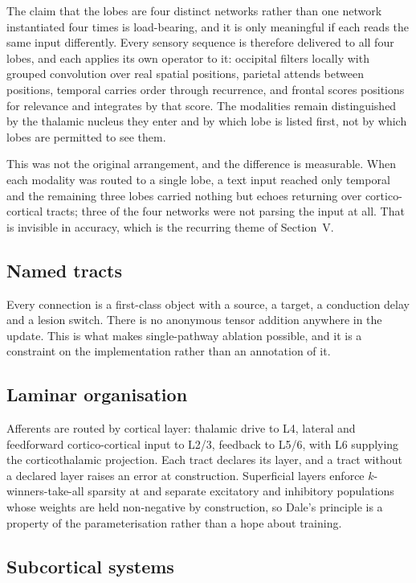 \documentclass[conference]{IEEEtran}
\begin{document}
The claim that the lobes are four distinct networks rather than one network
instantiated four times is load-bearing, and it is only meaningful if each
reads the same input differently. Every sensory sequence is therefore delivered
to all four lobes, and each applies its own operator to it: occipital filters
locally with grouped convolution over real spatial positions, parietal attends
between positions, temporal carries order through recurrence, and frontal
scores positions for relevance and integrates by that score. The modalities
remain distinguished by the thalamic nucleus they enter and by which lobe is
listed first, not by which lobes are permitted to see them.

This was not the original arrangement, and the difference is measurable. When
each modality was routed to a single lobe, a text input reached only temporal
and the remaining three lobes carried nothing but echoes returning over
cortico-cortical tracts; three of the four networks were not parsing the input
at all. That is invisible in accuracy, which is the recurring theme of
Section~V.

\subsection{Named tracts}

Every connection is a first-class object with a source, a target, a conduction
delay and a lesion switch. There is no anonymous tensor addition anywhere in the
update. This is what makes single-pathway ablation possible, and it is a
constraint on the implementation rather than an annotation of it.

\subsection{Laminar organisation}

Afferents are routed by cortical layer: thalamic drive to L4, lateral and
feedforward cortico-cortical input to L2/3, feedback to L5/6, with L6 supplying
the corticothalamic projection. Each tract declares its layer, and a tract
without a declared layer raises an error at construction. Superficial layers
enforce $k$-winners-take-all sparsity at
\ArchitectureSparsity{} and separate excitatory and inhibitory populations whose
weights are held non-negative by construction, so Dale's principle is a property
of the parameterisation rather than a hope about training.

\subsection{Subcortical systems}
\end{document}
